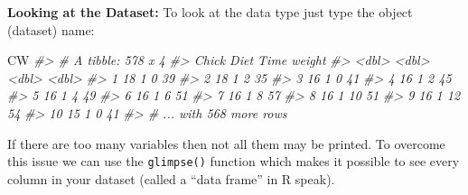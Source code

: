 \documentclass[
  14pt,
]{memoir}
\newenvironment{Shaded}{\begin{snugshade}}{\end{snugshade}}
\newcommand{\CommentTok}[1]{\textcolor[rgb]{0.56,0.35,0.01}{\textit{#1}}}
\newcommand{\FunctionTok}[1]{\textcolor[rgb]{0.00,0.00,0.00}{#1}}
\newcommand{\NormalTok}[1]{#1}
\begin{document}
\hfill\break

\textbf{Looking at the Dataset:}
To look at the data type just type the object (dataset) name:

\begin{Shaded}
\begin{Highlighting}[]
\NormalTok{CW}
\CommentTok{\#\textgreater{} \# A tibble: 578 x 4}
\CommentTok{\#\textgreater{}    Chick  Diet  Time weight}
\CommentTok{\#\textgreater{}    \textless{}dbl\textgreater{} \textless{}dbl\textgreater{} \textless{}dbl\textgreater{}  \textless{}dbl\textgreater{}}
\CommentTok{\#\textgreater{}  1    18     1     0     39}
\CommentTok{\#\textgreater{}  2    18     1     2     35}
\CommentTok{\#\textgreater{}  3    16     1     0     41}
\CommentTok{\#\textgreater{}  4    16     1     2     45}
\CommentTok{\#\textgreater{}  5    16     1     4     49}
\CommentTok{\#\textgreater{}  6    16     1     6     51}
\CommentTok{\#\textgreater{}  7    16     1     8     57}
\CommentTok{\#\textgreater{}  8    16     1    10     51}
\CommentTok{\#\textgreater{}  9    16     1    12     54}
\CommentTok{\#\textgreater{} 10    15     1     0     41}
\CommentTok{\#\textgreater{} \# ... with 568 more rows}
\end{Highlighting}
\end{Shaded}

If there are too many variables then not all them may be printed. To overcome this issue
we can use the \texttt{glimpse()} function which makes it possible to see every column in your
dataset (called a ``data frame'' in R speak).

\begin{Shaded}
\end{Shaded}
\end{document}
